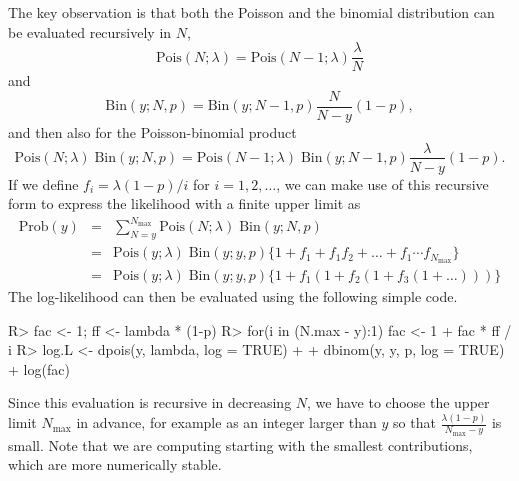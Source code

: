 \documentclass[codesnippet]{jss}
\begin{document}
The key observation is that both the Poisson and the binomial distribution can be evaluated recursively in $N$,
\begin{displaymath}
	\text{Pois}(N; \lambda) = \text{Pois}(N-1; \lambda) \frac{\lambda}{N}
\end{displaymath}
and
\begin{displaymath}
	\text{Bin}(y; N, p) = \text{Bin}(y; N-1, p) \frac{N}{N-y}(1-p),
\end{displaymath}
and then also for the Poisson-binomial product
\begin{displaymath}
	\text{Pois}(N ; \lambda) \; \text{Bin}(y; N, p)
	=
	\text{Pois}(N-1; \lambda) \; \text{Bin}(y; N-1, p)
	\frac{\lambda}{N-y}(1-p).
\end{displaymath}
If we define $f_i = \lambda(1-p)/i$ for $i=1, 2, \ldots$, we can make use of this recursive form to express the likelihood with a finite upper limit as
\begin{eqnarray}
	\text{Prob}(y) &=& \sum_{N = y}^{N_{\text{max}}}
	\text{Pois}(N ; \lambda)\;
	\text{Bin}(y; N, p) \nonumber\\
	&=& \text{Pois}(y; \lambda)\; \text{Bin}(y; y, p)
	\Big\{ 1 + f_1 + f_1f_2 +
	\ldots
	+f_1\cdots f_{N_\text{max}}
	\Big\} \nonumber\\
	&=& \text{Pois}(y; \lambda)\; \text{Bin}(y; y, p)
	\Big\{ 1 + f_1(1+f_2(1+f_3(1+ \dots)))\Big\}\nonumber
\end{eqnarray}
The log-likelihood can then be evaluated using the following simple  code.
\begin{CodeInput}
R> fac <- 1; ff <- lambda * (1-p)
R> for(i in (N.max - y):1) fac <- 1 + fac * ff / i
R> log.L <- dpois(y, lambda, log = TRUE) +
+    dbinom(y, y, p, log = TRUE) + log(fac)
\end{CodeInput}
Since this evaluation is recursive in decreasing $N$, we have to choose the upper limit $N_\text{max}$ in advance, for example as an integer larger than $y$ so that $\frac{\lambda (1-p)}{N_\text{max}-y}$ is small. Note that we are computing  starting with the smallest contributions, which are more numerically stable.
	
\end{document}
